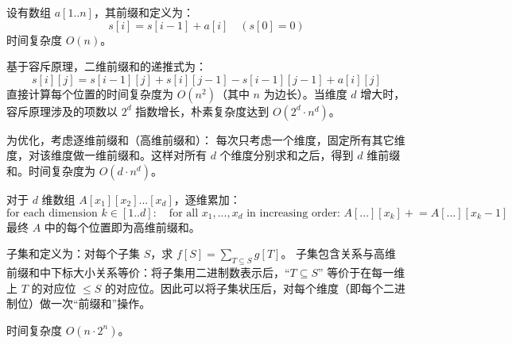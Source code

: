 
设有数组 $a[1..n]$，其前缀和定义为：
\[
s[i] = s[i-1] + a[i] \quad (s[0]=0)
\]
时间复杂度 $O(n)$。

基于容斥原理，二维前缀和的递推式为：
\[
s[i][j] = s[i-1][j] + s[i][j-1] - s[i-1][j-1] + a[i][j]
\]
直接计算每个位置的时间复杂度为 $O(n^2)$（其中 $n$ 为边长）。当维度 $d$ 增大时，容斥原理涉及的项数以 $2^d$ 指数增长，朴素复杂度达到 $O(2^d \cdot n^d)$。

为优化，考虑逐维前缀和（高维前缀和）：
每次只考虑一个维度，固定所有其它维度，对该维度做一维前缀和。这样对所有 $d$ 个维度分别求和之后，得到 $d$ 维前缀和。时间复杂度为 $O(d \cdot n^d)$。

对于 $d$ 维数组 $A[x_1][x_2]...[x_d]$，逐维累加：
\[
\text{for each dimension } k \in [1..d]:
\quad \text{for all } x_1,...,x_d \text{ in increasing order: } 
A[...][x_k] \mathrel{+}= A[...][x_k-1]
\]
最终 $A$ 中的每个位置即为高维前缀和。


子集和定义为：对每个子集 $S$，求 $f[S] = \sum_{T \subseteq S} g[T]$。  
子集包含关系与高维前缀和中下标大小关系等价：将子集用二进制数表示后，“$T \subseteq S$” 等价于在每一维上 $T$ 的对应位 $\le S$ 的对应位。因此可以将子集状压后，对每个维度（即每个二进制位）做一次“前缀和”操作。

时间复杂度 $O(n \cdot 2^n)$。